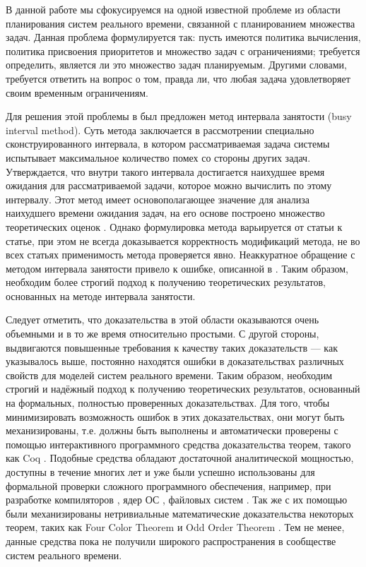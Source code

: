 В данной работе мы сфокусируемся на одной известной проблеме из области планирования
  систем реального времени, связанной с планированием множества задач. Данная
  проблема формулируется так: пусть имеются политика вычисления, политика присвоения
  приоритетов и множество задач с ограничениями; требуется определить, является ли
  это множество задач планируемым. Другими словами, требуется ответить
  на вопрос о том, правда ли, что любая задача удовлетворяет своим временным ограничениям.

Для решения этой проблемы в \cite{Lehoczky1990FixedPS} был предложен метод интервала
  занятости (busy interval method). Суть метода заключается в рассмотрении специально
  сконструированного интервала, в котором рассматриваемая задача системы  испытывает максимальное количество
  помех со стороны других задач. Утверждается, что внутри такого интервала достигается
  наихудшее время ожидания для рассматриваемой задачи, которое можно вычислить по этому интервалу.
  Этот метод имеет основополагающее
  значение для анализа наихудшего времени ожидания задач, на его основе построено
  множество теоретических оценок \cite{Bertogna2005ImprovedSA, Guo2015EDFSA, Lehoczky1990FixedPS,
  Zhang2009SchedulabilityAF}. Однако формулировка метода варьируется от статьи к
  статье, при этом не всегда доказывается корректность модификаций
  метода, не во всех статьях применимость метода проверяется явно. Неаккуратное
  обращение с методом интервала занятости привело к ошибке, описанной в
  \cite{Bril06messageresponse}. Таким образом, необходим более строгий подход к
  получению теоретических результатов, основанных на методе интервала занятости.

 Следует отметить, что доказательства в этой области оказываются очень
  объемными и в то же время относительно простыми. С другой стороны, выдвигаются повышенные требования
  к качеству таких доказательств --- как указывалось выше, постоянно находятся ошибки
  в доказательствах различных свойств  для моделей систем реального времени.
  Таким образом, необходим строгий и надёжный подход к получению теоретических результатов, основанный
  на формальных, полностью проверенных доказательствах. Для того, чтобы минимизировать
  возможность ошибок в этих доказательствах, они могут быть механизированы,
  т.е. должны быть выполнены и автоматически
  проверены с помощью интерактивного программного средства доказательства теорем,
  такого как Coq \cite{Coq}. Подобные средства обладают достаточной аналитической
  мощностью, доступны в течение многих лет и уже были успешно использованы для формальной
  проверки сложного программного обеспечения, например, при разработке компиляторов
  \cite{leroy}, ядер ОС \cite{klein}, файловых систем \cite{chen:2}. Так же с их
  помощью были механизированы нетривиальные математические доказательства некоторых
  теорем, таких как Four Color Theorem \cite{gonthier:1} и Odd Order Theorem \cite{gonthier:2}.
  Тем не менее, данные средства пока не получили широкого распространения в сообществе
  систем реального времени.

